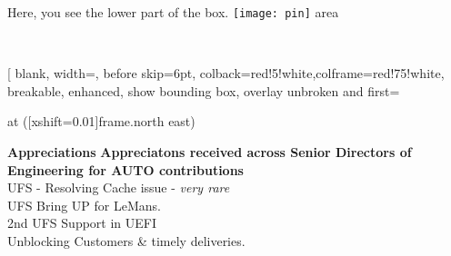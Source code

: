 \documentclass[a4paper]{chirri} %
\newcommand*{\localLocPin}{%
  \texttt{[image: pin]}%
}
\begin{document}
\layout                    %

\begin{headingbox}[skin=bicolor,colbacklower=yellow,lower separated=true]
\lipsum[1]
\tcblower
Here, you see the lower part of the box.
   {\Large{\localLocPin}}{} area
\end{headingbox}
\\[2\baselineskip]

\begin{tcolorbox}[
  blank,
  width=\LeftColWdth,
  before skip=6pt,
  colback=red!5!white,colframe=red!75!white,
  breakable,
  enhanced,                               %
  show bounding box,                      %
  overlay unbroken and first={%
    \node[inner sep=0pt,outer sep=0pt,
      text width=\RightColWdth,           %
      draw=blue, fill=red!5!white,        %
      align=none,
      below right]
      at ([xshift=0.01\textwidth]frame.north east)
  {%
      \textbf{Appreciations}
      \footnotesize{
         \textbf{Appreciatons received across Senior Directors of Engineering for AUTO contributions} \\
         \textbullet UFS - Resolving Cache issue - \emph{very rare} \\
         \textbullet UFS \textendash{} Bring UP for LeMans. \\
         \textbullet 2nd UFS Support in UEFI \\
         \textbullet Unblocking Customers \& timely deliveries.
      }


}}
\end{tcolorbox}
\end{document}
